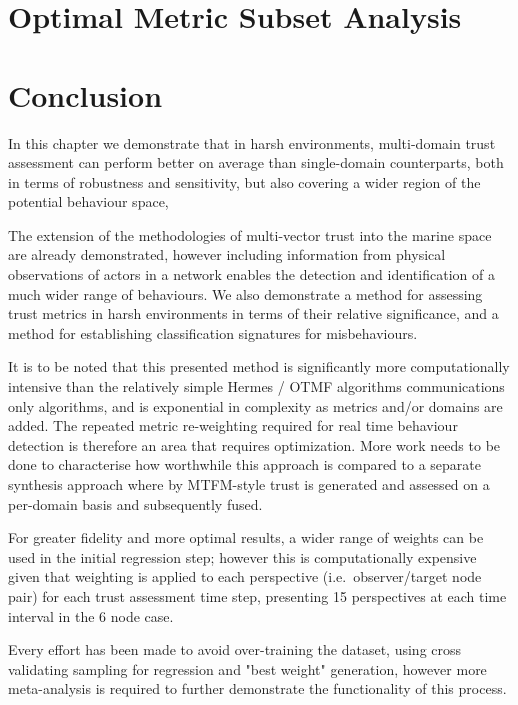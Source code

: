 \section{Optimal Metric Subset Analysis}


\section{Conclusion}
In this chapter we demonstrate that in harsh environments, multi-domain trust assessment can perform better on average than single-domain counterparts, both in terms of robustness and sensitivity, but also covering a wider region of the potential behaviour space, 

The extension of the methodologies of multi-vector trust into the marine space are already demonstrated, however including information from physical observations of actors in a network enables the detection and identification of a much wider range of behaviours.
We also demonstrate a method for assessing trust metrics in harsh environments in terms of their relative significance, and a method for establishing classification signatures for misbehaviours.

It is to be noted that this presented method is significantly more computationally intensive than the relatively simple Hermes / OTMF algorithms communications only algorithms, and is exponential in complexity as metrics and/or domains are added. The repeated metric re-weighting required for real time behaviour detection is therefore an area that requires optimization. More work needs to be done to characterise how worthwhile this approach is compared to a separate synthesis approach where by MTFM-style trust is generated and assessed on a per-domain basis and subsequently fused.

For greater fidelity and more optimal results, a wider range of weights can be used in the initial regression step; however this is computationally expensive given that weighting is applied to each perspective (i.e.\ observer/target node pair) for each trust assessment time step, presenting 15 perspectives at each time interval in the 6 node case.

Every effort has been made to avoid over-training the dataset, using cross validating sampling for regression and "best weight" generation, however more meta-analysis is required to further demonstrate the functionality of this process.



